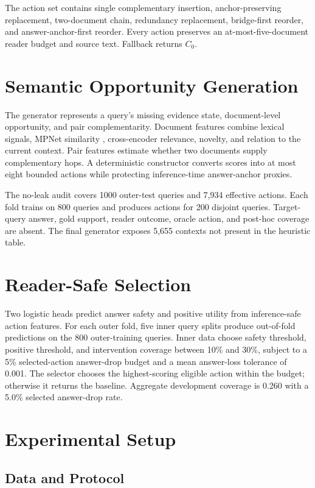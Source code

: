 The action set contains single complementary insertion, anchor-preserving replacement, two-document chain, redundancy replacement, bridge-first reorder, and answer-anchor-first reorder. Every action preserves an at-most-five-document reader budget and source text. Fallback returns $C_0$.

\section{Semantic Opportunity Generation}

The generator represents a query's missing evidence state, document-level opportunity, and pair complementarity. Document features combine lexical signals, MPNet similarity \citep{song-etal-2020-mpnet}, cross-encoder relevance, novelty, and relation to the current context. Pair features estimate whether two documents supply complementary hops. A deterministic constructor converts scores into at most eight bounded actions while protecting inference-time answer-anchor proxies.

The no-leak audit covers 1000 outer-test queries and 7,934 effective actions. Each fold trains on 800 queries and produces actions for 200 disjoint queries. Target-query answer, gold support, reader outcome, oracle action, and post-hoc coverage are absent. The final generator exposes 5,655 contexts not present in the heuristic table.

\section{Reader-Safe Selection}

Two logistic heads predict answer safety and positive utility from inference-safe action features. For each outer fold, five inner query splits produce out-of-fold predictions on the 800 outer-training queries. Inner data choose safety threshold, positive threshold, and intervention coverage between 10\% and 30\%, subject to a 5\% selected-action answer-drop budget and a mean answer-loss tolerance of 0.001. The selector chooses the highest-scoring eligible action within the budget; otherwise it returns the baseline. Aggregate development coverage is 0.260 with a 5.0\% selected answer-drop rate.

\section{Experimental Setup}

\subsection{Data and Protocol}

